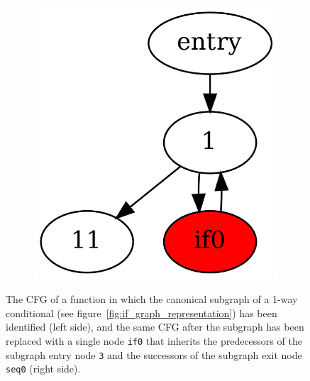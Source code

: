 \begin{figure}[htbp]
\begin{subfigure}[ht]{0.17\textwidth}
	\end{subfigure}
	\qquad
	\begin{subfigure}[ht]{0.17\textwidth}
		\includegraphics[width=\textwidth]{inc/3_background/cfg_post_merge.png}
	\end{subfigure}
	\caption{The CFG of a function in which the canonical subgraph of a 1-way conditional (see figure~\ref{fig:if_graph_representation}) has been identified (left side), and the same CFG after the subgraph has been replaced with a single node \texttt{if0} that inherits the predecessors of the subgraph entry node \texttt{3} and the successors of the subgraph exit node \texttt{seq0} (right side).}
	\label{fig:subgraph_merge}
\end{figure}
